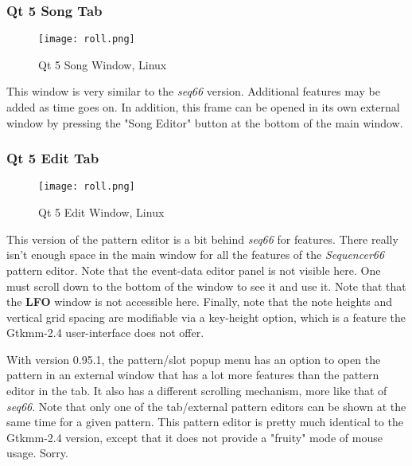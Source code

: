 \subsubsection{Qt 5 Song Tab}
\label{subsubsec:qt_portmidi_qt5_song_tab}

\begin{figure}[H]
   \centering 
   \texttt{[image: roll.png]}
   \caption{Qt 5 Song Window, Linux}
   \label{fig:qt5_song_window_linux}
\end{figure}

   This window is very similar to the \textsl{seq66} version.
   Additional features may be added as time goes on.  In addition,
   this frame can be opened in its own external window by
   pressing the "Song Editor" button at the bottom of the main window.

\subsubsection{Qt 5 Edit Tab}
\label{subsubsec:qt_portmidi_qt5_edit_tab}

\begin{figure}[H]
   \centering 
   \texttt{[image: roll.png]}
   \caption{Qt 5 Edit Window, Linux}
   \label{fig:qt5_edit_window_linux}
\end{figure}

   This version of the pattern editor is a bit behind
   \textsl{seq66} for features.  There really isn't enough space in the
   main window for all the features of the \textsl{Sequencer66} pattern editor.
   Note that the event-data editor panel is not visible here.
   One must scroll down to the bottom of the window to see it and use it.
   Note that that the \textbf{LFO} window is not accessible here.
   Finally, note that the note heights and vertical grid spacing are
   modifiable via a key-height option, which is a feature the Gtkmm-2.4
   user-interface does not offer.

   With version 0.95.1, the pattern/slot popup menu has an option to open the
   pattern in an external window that has a lot more features than the
   pattern editor in the tab.  It also has a different scrolling mechanism,
   more like that of \textsl{seq66}.
   Note that only one of the tab/external pattern
   editors can be shown at the same time for a given pattern.
   This pattern editor is pretty much identical to the Gtkmm-2.4 version,
   except that it does not provide a "fruity" mode of mouse usage.
   Sorry.

